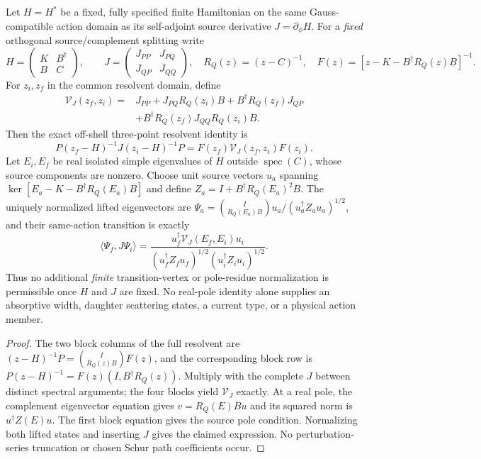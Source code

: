 \documentclass[12pt,a4paper]{article}
\begin{document}
\begin{theorem}
\label{p10:thm:v375-two-energy-dressed-transition}
Let $H=H^*$ be a fixed, fully specified finite Hamiltonian on the
same Gauss-compatible action domain as its self-adjoint source derivative
$J=\partial_\phi H$. For a \emph{fixed} orthogonal source/complement
splitting write
\[
 H=\begin{pmatrix}K&B^\dagger\\B&C\end{pmatrix},
 \qquad
 J=\begin{pmatrix}J_{PP}&J_{PQ}\\J_{QP}&J_{QQ}\end{pmatrix},
 \quad R_Q(z)=(z-C)^{-1},
 \quad F(z)=[z-K-B^\dagger R_Q(z)B]^{-1}.
\]
For $z_i,z_f$ in the common resolvent domain, define
\[
\boxed{\begin{aligned}
 \mathcal V_J(z_f,z_i)={}&J_{PP}
 +J_{PQ}R_Q(z_i)B+B^\dagger R_Q(z_f)J_{QP}\\
 &+B^\dagger R_Q(z_f)J_{QQ}R_Q(z_i)B.
\end{aligned}}
\]
Then the exact off-shell three-point resolvent identity is
\[
\boxed{P(z_f-H)^{-1}J(z_i-H)^{-1}P
 =F(z_f)\mathcal V_J(z_f,z_i)F(z_i).}
\]
Let $E_i,E_f$ be real isolated simple eigenvalues of $H$ outside
$\operatorname{spec}(C)$, whose source components are nonzero.
Choose unit source vectors $u_a$ spanning
$\ker[E_a-K-B^\dagger R_Q(E_a)B]$ and define
$Z_a=I+B^\dagger R_Q(E_a)^2B$.
The uniquely normalized lifted eigenvectors are
$\Psi_a=\binom{I}{R_Q(E_a)B}u_a/(u_a^\dagger Z_a u_a)^{1/2}$,
and their same-action transition is exactly
\[
\boxed{\langle\Psi_f,J\Psi_i\rangle=
\frac{u_f^\dagger\mathcal V_J(E_f,E_i)u_i}
{(u_f^\dagger Z_f u_f)^{1/2}(u_i^\dagger Z_i u_i)^{1/2}}.}
\]
Thus no additional \emph{finite} transition-vertex or pole-residue
normalization is permissible once $H$ and $J$ are fixed.
No real-pole identity alone supplies an absorptive width, daughter
scattering states, a current type, or a physical action member.
\end{theorem}
\begin{proof}
The two block columns of the full resolvent are
$(z-H)^{-1}P=\binom{I}{R_Q(z)B}F(z)$, and the corresponding
block row is $P(z-H)^{-1}=F(z)(I, B^\dagger R_Q(z))$.
Multiply with the complete $J$ between distinct spectral arguments;
the four blocks yield $\mathcal V_J$ exactly. At a real pole, the
complement eigenvector equation gives $v=R_Q(E)Bu$ and its squared
norm is $u^\dagger Z(E)u$. The first block equation gives the
source pole condition. Normalizing both lifted states and inserting
$J$ gives the claimed expression. No perturbation-series truncation
or chosen Schur path coefficients occur.
\end{proof}
\end{document}
